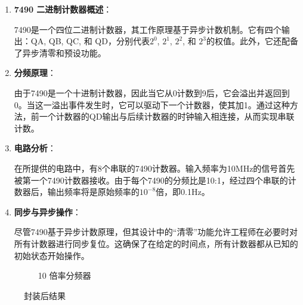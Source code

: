 \documentclass[UTF8,titlepage,a4paper]{ctexart}
\numberwithin{figure}{section}
\begin{document}
\begin{enumerate}
    \item \textbf{7490 二进制计数器概述}：
    
    7490是一个四位二进制计数器，其工作原理基于异步计数机制。它有四个输出：QA, QB, QC, 和 QD，分别代表$2^0$, $2^1$, $2^2$, 和 $2^3$的权值。此外，它还配备了异步清零和预设功能。
    
    \item \textbf{分频原理}：
    
    由于7490是一个十进制计数器，因此当它从0计数到9后，它会溢出并返回到0。当这一溢出事件发生时，它可以驱动下一个计数器，使其加1。通过这种方法，前一个计数器的QD输出与后续计数器的时钟输入相连接，从而实现串联计数。
    
    \item \textbf{电路分析}：
    
    在所提供的电路中，有8个串联的7490计数器。输入频率为10MHz的信号首先被第一个7490计数器接收。由于每个7490的分频比是10:1，经过四个串联的计数器后，输出频率将是原始频率的$10^{-8}$倍，即0.1Hz。
    
    \item \textbf{同步与异步操作}：
    
    尽管7490基于异步计数原理，但其设计中的“清零”功能允许工程师在必要时对所有计数器进行同步复位。这确保了在给定的时间点，所有计数器都从已知的初始状态开始操作。
\begin{figure}[H]
\centering
 \caption{10 倍率分频器}
 \label{}
\end{figure}
\end{enumerate}
\begin{figure}[H]
    \centering
     \caption{封装后结果}
     \label{}
    \end{figure}
\end{document}
